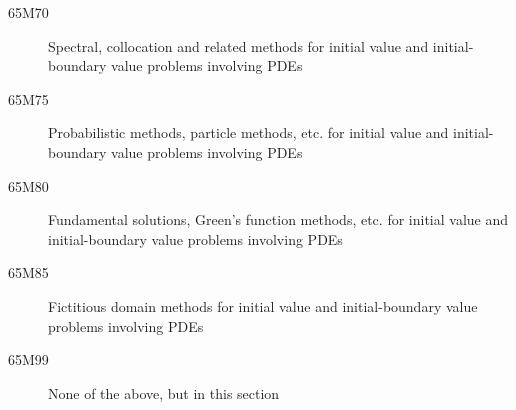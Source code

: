 \begin{description}
\item [65M70]\label{65M70} Spectral, collocation and related methods for initial value and initial-boundary value problems involving PDEs
\item [65M75]\label{65M75} Probabilistic methods, particle methods, etc. for initial value and initial-boundary value problems involving PDEs
\item [65M80]\label{65M80} Fundamental solutions, Green's function methods, etc. for initial value and initial-boundary value problems involving PDEs
\item [65M85]\label{65M85} Fictitious domain methods for initial value and initial-boundary value problems involving PDEs
\item [65M99]\label{65M99} None of the above, but in this section
\end{description}
